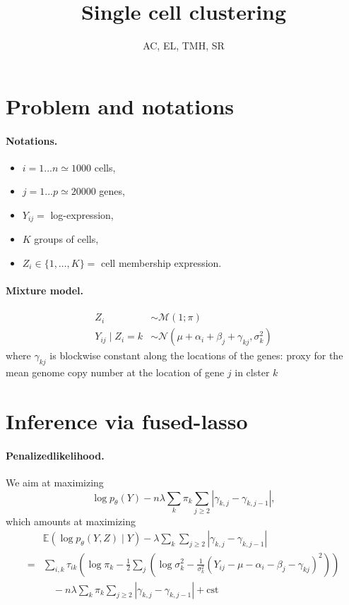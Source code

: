\documentclass[a4paper, 11pt]{article}
\title{Single cell clustering}
\author{AC, EL, TMH, SR}
\newcommand{\cst}{\text{cst}}
\newcommand{\Esp}{\mathbb{E}}
\newcommand{\Mcal}{\mathcal{M}}
\newcommand{\Ncal}{\mathcal{N}}
\begin{document}
\maketitle

\section{Problem and notations}

\paragraph{Notations.}
\begin{itemize}
 \item $i = 1 ... n \simeq 1000$ cells, 
 \item $j = 1 ... p \simeq 20000$ genes, 
 \item $Y_{ij} =$ log-expression,
 \item $K$ groups of cells,
 \item $Z_i \in \{1, \dots, K\} =$ cell membership expression.
\end{itemize}

\paragraph{Mixture model.}
\begin{align*}
 Z_i & \sim \Mcal(1; \pi) \\
 Y_{ij} \mid Z_i = k & \sim \Ncal(\mu + \alpha_i + \beta_j + \gamma_{kj}, \sigma_k^2)
\end{align*}
where $\gamma_{kj}$ is blockwise constant along the locations of the genes: proxy for the mean genome copy number at the location of gene $j$ in clster $k$

\section{Inference via fused-lasso}

\paragraph{Penalizedlikelihood.}
We aim at maximizing
$$
\log p_\theta(Y) - n \lambda \sum_k \pi_k \sum_{j\geq 2} |\gamma_{k,j} - \gamma_{k, j-1}|,
$$
which amounts at maximizing
\begin{align*}
 & \Esp \left(\log p_\theta(Y, Z)  \mid Y\right)- \lambda \sum_k \sum_{j\geq 2} |\gamma_{k,j} - \gamma_{k, j-1}| \\
 = & \sum_{i, k} \tau_{ik} \left(\log \pi_k - \frac12 \sum_j \left( \log\sigma^2_k - \frac1{\sigma^2_k} (Y_{ij} - \mu - \alpha_i - \beta_j - \gamma_{kj})^2 \right) \right) \\
 & \quad - n \lambda \sum_k \pi_k \sum_{j\geq 2} |\gamma_{k,j} - \gamma_{k, j-1}| + \cst
\end{align*}
\end{document}
